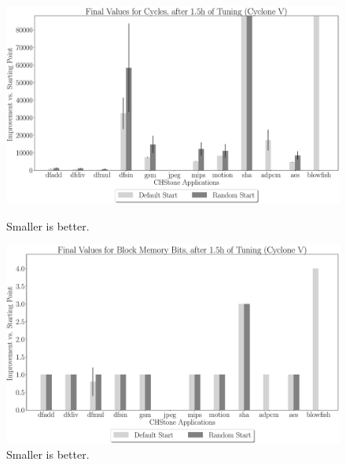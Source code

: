 \documentclass[12pt, a4paper]{article}
\begin{document}
\begin{figure}[htpb]
    \begin{minipage}{.48\textwidth}
        \centering
        \includegraphics[width=.8\textwidth]{abs_comp_cycles_5400_chstone_CycloneV}
        \caption{Smaller is better.}
    \end{minipage}%
    \begin{minipage}{.48\textwidth}
        \centering
        \includegraphics[width=.8\textwidth]{abs_comp_block_5400_chstone_CycloneV}
        \caption{Smaller is better.}
    \end{minipage}%
\end{figure}
\end{document}
